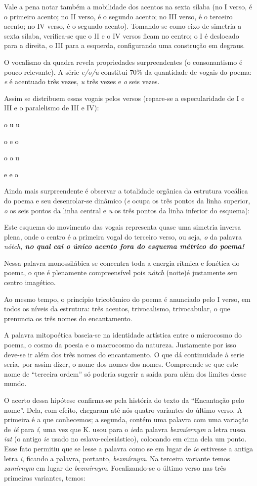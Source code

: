Vale a pena notar também a mobilidade dos acentos na sexta sílaba (no I
verso, é o primeiro acento; no II verso, é o segundo acento; no III
verso, é o terceiro acento; no IV verso, é o segundo acento). Tomando-se
como eixo de simetria a sexta sílaba, verifica-se que o II e o IV versos
ficam no centro; o I é deslocado para a direita, o III para a esquerda,
configurando uma construção em degraus.

O vocalismo da quadra revela propriedades surpreendentes (o
consonantismo é pouco relevante). A série \emph{e/o/u} constitui 70\% da
quantidade de vogais do poema: \emph{e} é acentuado três vezes, \emph{u}
três vezes e \emph{o} seis vezes.

Assim se distribuem essas vogais pelos versos (repare-se a
especularidade de I e III e o paralelismo de III e IV):

o u u

o e o

o o u

e e o

Ainda mais surpreendente é observar a totalidade orgânica da estrutura
vocálica do poema e seu desenrolar-se dinâmico (\emph{e} ocupa os três
pontos da linha superior, \emph{o} os seis pontos da linha central e
\emph{u} os três pontos da linha inferior do esquema):

Este esquema do movimento das vogais representa quase uma simetria
inversa plena, onde o centro é a primeira vogal do terceiro verso, ou
seja, \emph{o} da palavra \emph{nótch, \textbf{no qual cai o único
acento fora do esquema métrico do poema!}}

Nessa palavra monossilábica se concentra toda a energia rítmica e
fonética do poema, o que é plenamente compreensível pois \emph{nótch}
(noite)é justamente seu centro imagético.

Ao mesmo tempo, o princípio tricotômico do poema é anunciado pelo I
verso, em todos os níveis da estrutura: três acentos, trivocalismo,
trivocabular, o que prenuncia os três nomes do encantamento.

A palavra mitopoética baseia-se na identidade artística entre o
microcosmo do poema, o cosmo da poesia e o macrocosmo da natureza.
Justamente por isso deve-se ir além dos três nomes do encantamento. O
que dá continuidade à serie seria, por assim dizer, o nome dos nomes dos
nomes. Compreende-se que este nome de ``terceira ordem'' só poderia
sugerir a saída para além dos limites desse mundo.

O acerto dessa hipótese confirma-se pela história do texto da
``Encantação pelo nome''. Dela, com efeito, chegaram até nós quatro
variantes do último verso. A primeira é a que conhecemos; a segunda,
contém uma palavra com uma variação de \emph{ié} para \emph{í}, uma vez
que K. usou para o \emph{\emph{ie}}da palavra \emph{bezm\emph{íe}rnym} a
letra russa \emph{iat} (o antigo \emph{ie} usado no
eslavo-eclesiástico), colocando em cima dela um ponto. Esse fato
permitiu que se lesse a palavra como se em lugar de \emph{\emph{ie}}
estivesse a antiga letra \emph{i}, ficando a palavra, portanto,
\emph{bezmírnym}. Na terceira variante temos \emph{zamírnym} em lugar de
\emph{bezmírnym}. Focalizando-se o último verso nas três primeiras
variantes, temos:

